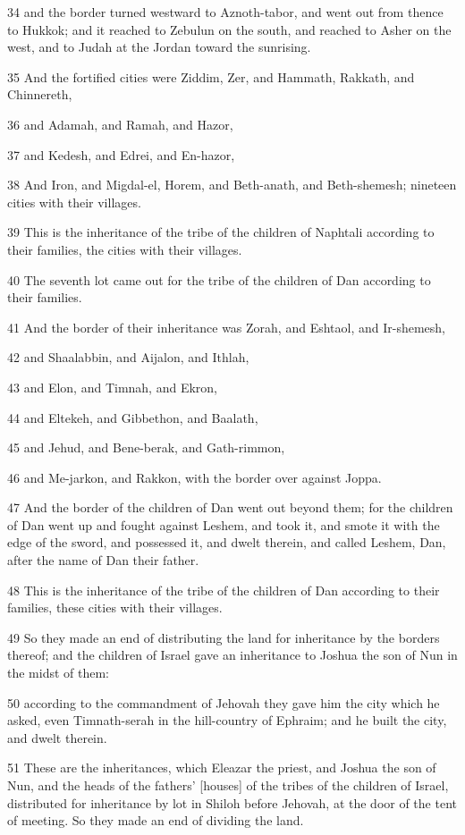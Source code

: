 \par 34 and the border turned westward to Aznoth-tabor, and went out from thence to Hukkok; and it reached to Zebulun on the south, and reached to Asher on the west, and to Judah at the Jordan toward the sunrising.
\par 35 And the fortified cities were Ziddim, Zer, and Hammath, Rakkath, and Chinnereth,
\par 36 and Adamah, and Ramah, and Hazor,
\par 37 and Kedesh, and Edrei, and En-hazor,
\par 38 And Iron, and Migdal-el, Horem, and Beth-anath, and Beth-shemesh; nineteen cities with their villages.
\par 39 This is the inheritance of the tribe of the children of Naphtali according to their families, the cities with their villages.
\par 40 The seventh lot came out for the tribe of the children of Dan according to their families.
\par 41 And the border of their inheritance was Zorah, and Eshtaol, and Ir-shemesh,
\par 42 and Shaalabbin, and Aijalon, and Ithlah,
\par 43 and Elon, and Timnah, and Ekron,
\par 44 and Eltekeh, and Gibbethon, and Baalath,
\par 45 and Jehud, and Bene-berak, and Gath-rimmon,
\par 46 and Me-jarkon, and Rakkon, with the border over against Joppa.
\par 47 And the border of the children of Dan went out beyond them; for the children of Dan went up and fought against Leshem, and took it, and smote it with the edge of the sword, and possessed it, and dwelt therein, and called Leshem, Dan, after the name of Dan their father.
\par 48 This is the inheritance of the tribe of the children of Dan according to their families, these cities with their villages.
\par 49 So they made an end of distributing the land for inheritance by the borders thereof; and the children of Israel gave an inheritance to Joshua the son of Nun in the midst of them:
\par 50 according to the commandment of Jehovah they gave him the city which he asked, even Timnath-serah in the hill-country of Ephraim; and he built the city, and dwelt therein.
\par 51 These are the inheritances, which Eleazar the priest, and Joshua the son of Nun, and the heads of the fathers' [houses] of the tribes of the children of Israel, distributed for inheritance by lot in Shiloh before Jehovah, at the door of the tent of meeting. So they made an end of dividing the land.

